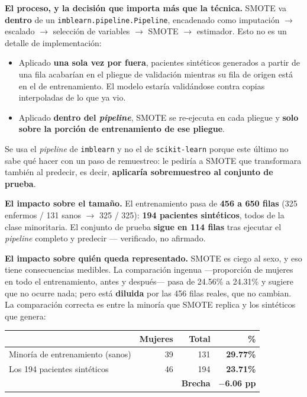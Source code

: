 \documentclass[10pt,a4paper]{article}
\begin{document}
\textbf{El proceso, y la decisión que importa más que la técnica.} SMOTE va \textbf{dentro} de un \texttt{imblearn.\allowbreak pipeline.\allowbreak Pipeline}, encadenado como imputación $\rightarrow$ escalado $\rightarrow$ selección de variables $\rightarrow$ SMOTE $\rightarrow$ estimador. Esto no es un detalle de implementación:

\begin{itemize}
\item Aplicado \textbf{una sola vez por fuera}, pacientes sintéticos generados a partir de una fila acabarían en el pliegue de validación mientras su fila de origen está en el de entrenamiento. El modelo estaría validándose contra copias interpoladas de lo que ya vio.
\item Aplicado \textbf{dentro del \textit{pipeline}}, SMOTE se re-ejecuta en cada pliegue y \textbf{solo sobre la porción de entrenamiento de ese pliegue}.
\end{itemize}

Se usa el \textit{pipeline} de \texttt{imblearn} y no el de \texttt{scikit-learn} porque este último no sabe qué hacer con un paso de remuestreo: le pediría a SMOTE que transformara también al predecir, es decir, \textbf{aplicaría sobremuestreo al conjunto de prueba}.

\textbf{El impacto sobre el tamaño.} El entrenamiento pasa de \textbf{456 a 650 filas} (325 enfermos / 131 sanos $\rightarrow$ 325 / 325): \textbf{194 pacientes sintéticos}, todos de la clase minoritaria. El conjunto de prueba \textbf{sigue en 114 filas} tras ejecutar el \textit{pipeline} completo y predecir --- verificado, no afirmado.

\textbf{El impacto sobre quién queda representado.} SMOTE es ciego al sexo, y eso tiene consecuencias medibles. La comparación ingenua ---proporción de mujeres en todo el entrenamiento, antes y después--- pasa de 24.56\% a 24.31\% y sugiere que no ocurre nada; pero está \textbf{diluida} por las 456 filas reales, que no cambian. La comparación correcta es entre la minoría que SMOTE replica y los sintéticos que genera:

\begin{table}[H]
\footnotesize
\centering
\begin{tabular}{@{}l r r r@{}}
\toprule
& \textbf{Mujeres} & \textbf{Total} & \textbf{\%} \\
\midrule
Minoría de entrenamiento (sanos) & 39 & 131 & \textbf{29.77\%} \\
Los 194 pacientes sintéticos & 46 & 194 & \textbf{23.71\%} \\
\midrule
& & \textbf{Brecha} & \textbf{$-$6.06 pp} \\
\bottomrule
\end{tabular}
\end{table}
\end{document}
